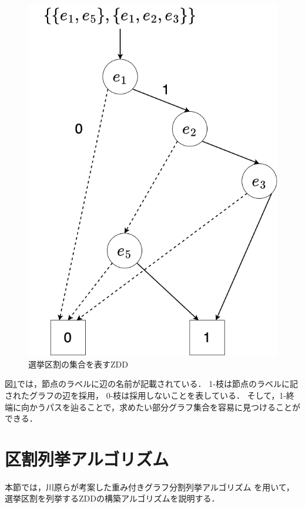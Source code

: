 \begin{figure}[ht]
  \centering
  \includegraphics[scale=0.25]{img/kuwari_zdd.png}
  \caption{選挙区割の集合を表すZDD}
  \label{kuwari_zdd}
\end{figure}

図\ref{kuwari_zdd}では，節点のラベルに辺の名前が記載されている．
1-枝は節点のラベルに記されたグラフの辺を採用，
0-枝は採用しないことを表している．
そして，1-終端に向かうパスを辿ることで，求めたい部分グラフ集合を容易に見つけることができる．

\section{区割列挙アルゴリズム}
本節では，川原らが考案した重み付きグラフ分割列挙アルゴリズム\cite{kawahara}
を用いて，選挙区割を列挙するZDDの構築アルゴリズムを説明する．

